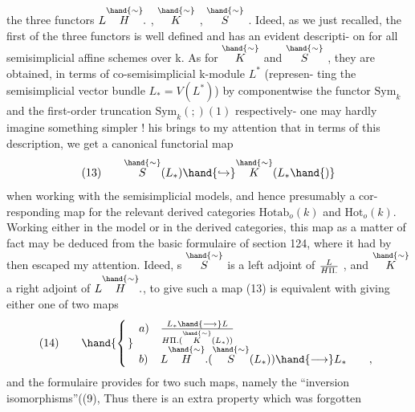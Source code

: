
the three functors $L\overset{\hand{\sim}}{H}.$ , $\overset{\hand{\sim}}{K}$ , $\overset{\hand{\sim}}{S}$ . Ideed, as we just recalled, the
first of the three functors is well defined and has an evident descripti-%
on for all semisimplicial affine schemes over k. As for $\overset{\hand{\sim}}{K}$ and $\overset{\hand{\sim}}{S}$ ,
they are obtained, in terms of  co-semisimplicial k-module $L^*$ (represen-%
ting the semisimplicial vector bundle  $L_* = V(L^*)$) by  
componentwise the functor $\mathrm{Sym}_k$ and the first-order truncation
$\mathrm{Sym}_k(;)(1)$ respectively\xout{\unsure{,}}- one may hardly imagine something simpler !
his brings to my attention that in terms of this description, we get
a canonical functorial map
\[
(13)\qquad \overset{\hand{\sim}}{S}(L_*)\hand{\hookrightarrow}\overset{\hand{\sim}}{K}(L_*\hand{)}
\]
when working with the semisimplicial models, and hence presumably a cor-%
responding map for the  relevant derived categories $\mathrm{Hotab}_o(k)$ and $\mathrm{Hot}_o(k)$.
Working either in the model or in the derived categories, this map as
a matter of fact may be deduced from the basic formulaire of section
124, where it had by then escaped my attention. Ideed, s $\overset{\hand{\sim}}{S}$ is a
left adjoint of $L\over{H}{\Pi}.$ , and $\overset{\hand{\sim}}{K}$ a right adjoint of $L\overset{\hand{\sim}}{H}.$, to give such
a map (13) is equivalent with giving either one of two maps
\[
(14)\qquad \hand{\left\{\rule{0pt}{2.5em}\right.}
\begin{array}{ll}
a) & L_* \hand{\longrightarrow} L\over{H}{\Pi}.(\overset{\hand{\sim}}{K}(L_*))\\
b) & L\overset{\hand{\sim}}{H}.(\overset{\hand{\sim}}{S}(L_*)) \hand{\longrightarrow} L_* \qquad ,
\end{array}
\]
and the formulaire provides for two such maps, namely the ``inversion
isomorphisms''((9),  Thus there is an extra property which was forgotten
